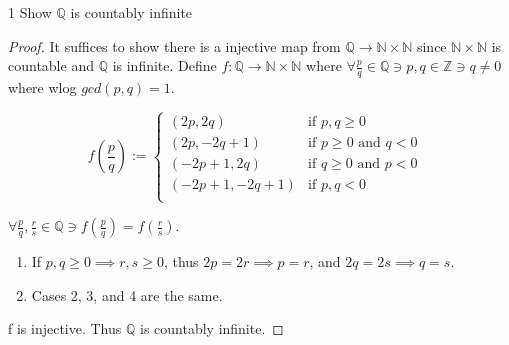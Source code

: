\documentclass{article}
\newcommand{\Q}{\mathbb{Q}}
\newcommand{\Z}{\mathbb{Z}}
\newcommand{\N}{\mathbb{N}}
\begin{document}
\begin{PROB}{1}\label{Problem 1.}
    Show $\Q$ is countably infinite 
\end{PROB}
\begin{proof}
    It suffices to show there is a injective map from $\Q \to \N \times \N$ since $\N \times \N$ is countable and $\Q$ is infinite. Define $f: \Q \to \N \times \N $ where $\forall \frac{p}{q} \in \Q \ni p, q \in \Z \ni q \neq 0$ where wlog $gcd(p, q) = 1$. 
    
    \begin{equation*}
        f\left(\frac{p}{q}\right) := \begin{cases*}
            (2p, 2q) & \text{if $p, q \geq 0$} \\
            (2p, -2q + 1) & \text{if $p\geq 0$ and $q < 0$ } \\
            (-2p + 1, 2q) & \text{if $q \geq 0$ and $p < 0$ } \\
            (-2p + 1, -2q + 1) & \text{if $p, q < 0$ } \\
        \end{cases*}
    \end{equation*}

    $\forall \frac{p}{q}, \frac{r}{s} \in \Q \ni f(\frac{p}{q}) = f(\frac{r}{s})$. 
    
    \begin{enumerate}
        \item If $p, q \geq 0 \implies r, s \geq 0$, thus $2p = 2r \implies p = r$, and $2q = 2s \implies q = s$. 
        \item Cases 2, 3, and 4 are the same.    
    \end{enumerate}
    
    f is injective. Thus $\Q$ is countably infinite. 
\end{proof}

\bigskip
\end{document}
